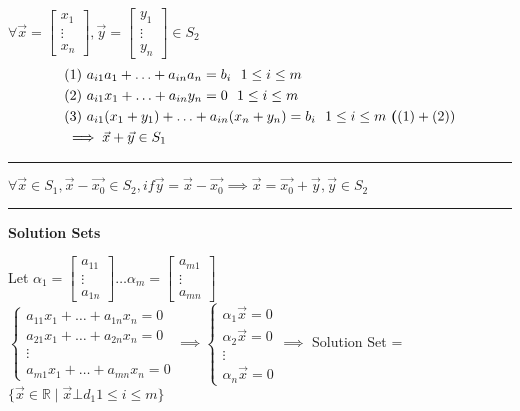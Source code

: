 \documentclass{article}
\newenvironment{proof}{{\bf Proof:}}{\hfill\rule{2mm}{2mm}}
\begin{document}
\begin{proof} \( \forall \vec{x} = \begin{bmatrix} x_1 \\ \vdots \\ x_n \end{bmatrix} , \vec{y} = \begin{bmatrix} y_1 \\ \vdots \\ y_n \end{bmatrix} \in S_2 \) \\
\[ \begin{aligned} & (1 ) \ a_{i1} a_1 + \ldots + a_{in} a_n  = b_i \  \ 1 \leq i \leq m \\
& (2 ) \ a_{i1} x_1 + \ldots + a_{in} y_n  = 0 \  \ 1 \leq i \leq m \\
&  (3 ) \ a_{i1} (x_1 + y_1 ) + \ldots + a_{in} (x_n + y_n)  = b_i  \  \ 1 \leq i \leq m \ \textbf( (1) + (2))  \\
& \implies \vec{x} + \vec{y} \in S_1 \end{aligned} \]
\end{proof}

\begin{proof}
\( \forall \vec{x} \in S_1, \vec{x} - \vec{x_0} \in S_2, if \vec{y} = \vec{x} - \vec{x_0} \implies \vec{x} = \vec{x_0} + \vec{y}, \vec{y} \in S_2\)
\end{proof}

\textbf{Solution Sets }

Let \( \alpha_1 = \begin{bmatrix} a_{11} \\ \vdots \\ a_{1n}  \end{bmatrix} \ldots  \alpha_m = \begin{bmatrix} a_{m1} \\ \vdots \\ a_{mn} \end{bmatrix}\) \\
\( \begin{cases} a_{11} x_1 + \ldots + a_{1n} x_n = 0 \\ a_{21}x_1 + \ldots + a_{2n} x_n = 0 \\
\vdots \\ a_{m1}x_1 + \ldots + a_{mn} x_n = 0 \end{cases} \implies \begin{cases} \alpha_1 \vec{x} = 0\\ \alpha_2 \vec{x} = 0  \\ \vdots \\ \alpha_n \vec{x} = 0 \end{cases} \implies \) Solution Set = \( \{ \vec{x} \in \mathbb{R} \mid \vec{x} \bot d_1 1 \leq i \leq m \}\) \\
\end{document}
